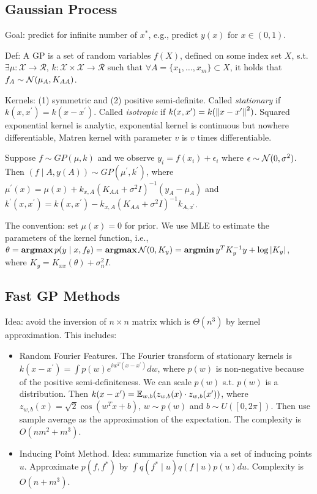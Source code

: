\subsection{Gaussian Process}

Goal: predict for infinite number of $x^*$, e.g., predict $y(x)$ for $x\in(0,1)$.

Def: A GP is a  set of random variables $f(X)$, defined on some index set $X$, s.t.  $\exists \mu: \mathcal{X}\rightarrow \mathcal{R}$, $k:\mathcal{X}\times \mathcal{X}\rightarrow\mathcal{R}$ such that $\forall A=\{x_1,\dots,x_m\}\subset X$, it holds that $f_A\sim\mathcal{N}(\mu_A, K_{AA})$.

Kernels: (1) symmetric and (2) positive semi-definite. Called \emph{stationary} if $k(x,x^\prime)=k(x-x^\prime)$. Called \emph{isotropic} if $k(x,x^\prime)=k(\left\lVert x-x^\prime\right\rVert^2)$. Squared exponential kernel is analytic, exponential kernel is continuous but nowhere differentiable, Matren kernel with parameter $v$ is $v$ times differentiable.

Suppose $f\sim GP(\mu, k)$ and we observe $y_i=f(x_i)+\epsilon_i$ where $\epsilon\sim\mathcal{N}(0,\sigma^2)$. Then $(f\mid A,y(A))\sim GP(\mu^\prime, k^\prime)$, where $\mu^\prime(x) = \mu(x)+k_{x,A}(K_{AA}+\sigma^2I)^{-1}(y_A-\mu_A)$ and $k^\prime(x,x^\prime)=k(x,x^\prime)-k_{x,A}(K_{AA}+\sigma^2I)^{-1}k_{A,x^\prime}$.

The convention: set $\mu(x)=0$ for prior. We use MLE to estimate the parameters of the kernel function, i.e., $\theta = \operatorname{\textbf{argmax}} p(y\mid x, f_\theta) = \operatorname{\textbf{argmax}} \mathcal{N}(0, K_y) = \operatorname{\textbf{argmin}} y^T K_y^{-1}y+\log|K_y|$, where $K_y=K_{xx}(\theta)+\sigma_n^2I$.

\subsection{Fast GP Methods}

Idea: avoid the inversion of $n\times n$ matrix which is $\Theta(n^3)$ by kernel approximation. This includes:
\begin{itemize}
    \item Random Fourier Features. The Fourier transform of stationary kernels is $k(x-x^\prime) = \int p(w)e^{iw^T(x-x^\prime)} dw$, where $p(w)$ is non-negative because of the positive semi-definiteness. We can scale $p(w)$ s.t. $p(w)$ is a distribution. Then $k(x-x^\prime) = \mathbb{E}_{w,b} (z_{w,b}(x)\cdot z_{w,b}(x^\prime))$, where $z_{w,b}(x)=\sqrt{2}\cos(w^Tx+b)$, $w\sim p(w)$ and $b\sim U([0,2\pi])$. Then use sample average as the approximation of the expectation. The complexity is $O(nm^2+m^3)$.
    \item Inducing Point Method. Idea: summarize function via a set of inducing points $u$. Approximate $p(f, f^*)$ by $\int q(f^*\mid u)q(f\mid u)p(u) du$. Complexity is $O(n+m^3)$.
\end{itemize}